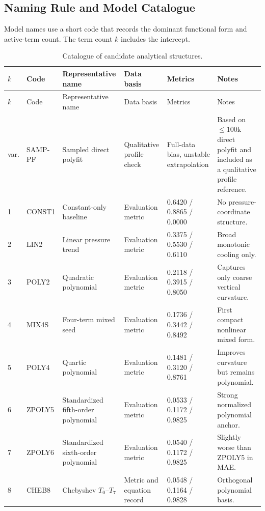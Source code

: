\documentclass[10pt]{article}
\newcommand{\metric}[3]{#1 / #2 / #3}
\begin{document}
\subsection{Naming Rule and Model Catalogue}

\noindent
Model names use a short code that records the dominant functional form and active-term count.
The term count $k$ includes the intercept.

\begingroup
\small
\setlength{\tabcolsep}{3pt}
\renewcommand{\arraystretch}{1.12}
\begin{longtable}{C{0.7cm}C{1.5cm}L{3.8cm}L{2.45cm}L{3.0cm}L{3.3cm}}
\caption{Catalogue of candidate analytical structures.}\\
\toprule
$k$ & Code & Representative name & Data basis & Metrics & Notes \\
\midrule
\endfirsthead
\toprule
$k$ & Code & Representative name & Data basis & Metrics & Notes \\
\midrule
\endhead
var. & SAMP-PF & Sampled direct polyfit & Qualitative profile check & Full-data bias, unstable extrapolation & Based on $\leq100$k direct polyfit and included as a qualitative profile reference. \\
1 & CONST1 & Constant-only baseline & Evaluation metric & \metric{0.6420}{0.8865}{0.0000} & No pressure-coordinate structure. \\
2 & LIN2 & Linear pressure trend & Evaluation metric & \metric{0.3375}{0.5530}{0.6110} & Broad monotonic cooling only. \\
3 & POLY2 & Quadratic polynomial & Evaluation metric & \metric{0.2118}{0.3915}{0.8050} & Captures only coarse vertical curvature. \\
4 & MIX4S & Four-term mixed seed & Evaluation metric & \metric{0.1736}{0.3442}{0.8492} & First compact nonlinear mixed form. \\
5 & POLY4 & Quartic polynomial & Evaluation metric & \metric{0.1481}{0.3120}{0.8761} & Improves curvature but remains polynomial. \\
6 & ZPOLY5 & Standardized fifth-order polynomial & Evaluation metric & \metric{0.0533}{0.1172}{0.9825} & Strong normalized polynomial anchor. \\
7 & ZPOLY6 & Standardized sixth-order polynomial & Evaluation metric & \metric{0.0540}{0.1172}{0.9825} & Slightly worse than ZPOLY5 in MAE. \\
8 & CHEB8 & Chebyshev $T_0$--$T_7$ & Metric and equation record & \metric{0.0548}{0.1164}{0.9828} & Orthogonal polynomial basis. \\

\end{longtable}
\end{document}
